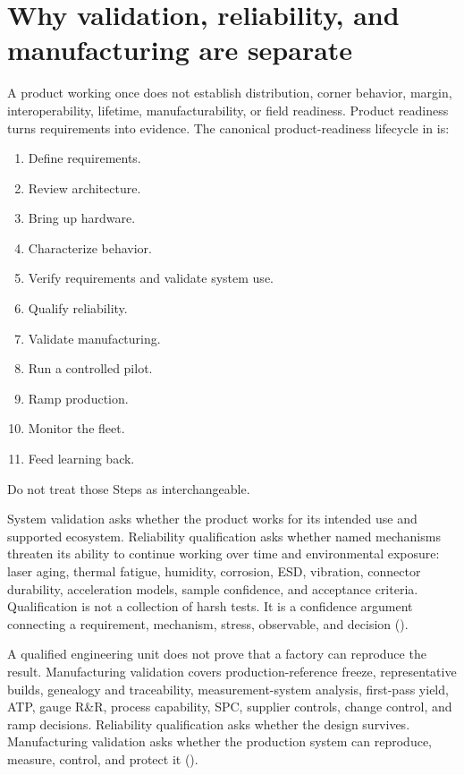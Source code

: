 \section{Why validation, reliability, and manufacturing are separate}

A product working once does not establish distribution, corner behavior, margin,
interoperability, lifetime, manufacturability, or field readiness. Product
readiness turns requirements into evidence. The canonical product-readiness
lifecycle in  is:

\begin{enumerate}
\item Define requirements.
\item Review architecture.
\item Bring up hardware.
\item Characterize behavior.
\item Verify requirements and validate system use.
\item Qualify reliability.
\item Validate manufacturing.
\item Run a controlled pilot.
\item Ramp production.
\item Monitor the fleet.
\item Feed learning back.
\end{enumerate}

Do not treat those Steps as interchangeable.

System validation asks whether the product works for its intended use and
supported ecosystem. Reliability qualification asks whether named mechanisms
threaten its ability to continue working over time and environmental exposure:
laser aging, thermal fatigue, humidity, corrosion, ESD, vibration, connector
durability, acceleration models, sample confidence, and acceptance criteria.
Qualification is not a collection of harsh tests. It is a confidence argument
connecting a requirement, mechanism, stress, observable, and decision
().

A qualified engineering unit does not prove that a factory can reproduce the
result. Manufacturing validation covers production-reference freeze,
representative builds, genealogy and traceability, measurement-system analysis,
first-pass yield, ATP, gauge R\&R, process capability, SPC, supplier controls,
change control, and ramp decisions. Reliability qualification asks whether the
design survives. Manufacturing validation asks whether the production system can
reproduce, measure, control, and protect it ().

